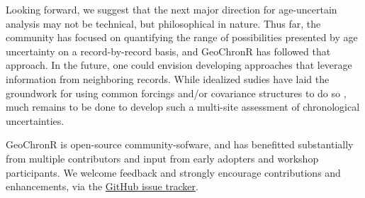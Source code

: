 \documentclass[gchron, manuscript]{copernicus}
\begin{document}
Looking forward, we suggest that the next major direction for age-uncertain analysis may not be technical, but philosophical in nature. Thus far, the community has focused on quantifying the range of possibilities presented by age uncertainty on a record-by-record basis, and GeoChronR has followed that approach. In the future, one could envision developing approaches that leverage information from neighboring records. While idealized sudies have laid the groundwork for using common forcings and/or covariance structures to do so \citep{wernerTingley2015}, much remains to be done to develop such a multi-site assessment of chronological uncertainties.

GeoChronR is open-source community-sofware, and has benefitted substantially from multiple contributors and input from early adopters and workshop participants.
We welcome feedback and strongly encourage contributions and enhancements, via the \href{https://github.com/nickmckay/GeoChronR/issues}{GitHub issue tracker}.











\end{document}

